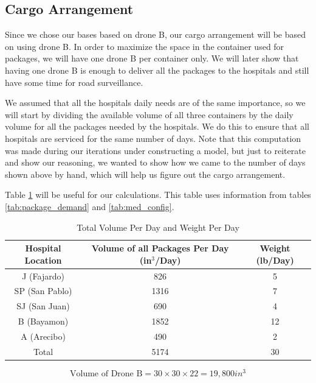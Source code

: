 \subsection{Cargo Arrangement}

Since we chose our bases based on drone B, our cargo arrangement will be based on using drone B. In order to maximize the space in the container used for packages, we will have one drone B per container only. We will later show that having one drone B is enough to deliver all the packages to the hospitals and still have some time for road surveillance. 

We assumed that all the hospitals daily needs are of the same importance, so we will start by dividing the available volume of all three containers by the daily volume for all the packages needed by the hospitals. We do this to ensure that all hospitals are serviced for the same number of days. Note that this computation was made during our iterations under constructing a model, but just to reiterate and show our reasoning, we wanted to show how we came to the number of days shown above by hand, which will help us figure out the cargo arrangement. 

Table \ref{tab:tot_daily_vol} will be useful for our calculations. This table uses information from tables \ref{tab:package_demand} and \ref{tab:med_config}.
\begin{table}[h]
    \centering
    \begin{tabular}{c|c|c}
    \hline Hospital Location &  Volume of all Packages Per Day (in$^3$/Day) & Weight (lb/Day) \\
    \hline
    J (Fajardo) & 826 & 5\\
    SP (San Pablo) & 1316 & 7\\
    SJ (San Juan) &  690 & 4\\
    B (Bayamon) & 1852 & 12\\
    A (Arecibo) & 490 & 2\\
    \hline
    Total &  5174 & 30\\
    \hline
    
    \end{tabular}
    \caption{Total Volume Per Day and Weight Per Day}
    \label{tab:tot_daily_vol}
\end{table}


\begin{equation}
    \text{Volume of Drone B} = 30 \times 30 \times 22 = 19,800 in^3
    \label{eq:B_vol}
\end{equation}

